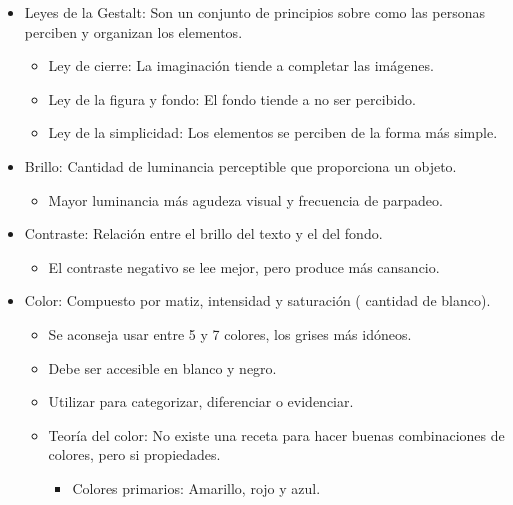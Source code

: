 \documentclass[12pt, twoside, openright]{report} %
\begin{document}
\begin{itemize}
	\item Leyes de la Gestalt: Son un conjunto de principios sobre como
	      las personas perciben y organizan los elementos.

	      \begin{itemize}
		      \item Ley de cierre: La imaginación tiende a completar las imágenes.

		      \item Ley de la figura y fondo: El fondo tiende a no ser percibido.

		      \item Ley de la simplicidad: Los elementos se perciben de la forma
		            más simple.
	      \end{itemize}
	\item Brillo: Cantidad de luminancia perceptible que proporciona un
	      objeto.

	      \begin{itemize}
		      \item Mayor luminancia más agudeza visual y frecuencia de parpadeo.
	      \end{itemize}
	\item Contraste: Relación entre el brillo del texto y el del fondo.

	      \begin{itemize}
		      \item El contraste negativo se lee mejor, pero produce más
		            cansancio.
	      \end{itemize}
	\item Color: Compuesto por matiz, intensidad y saturación ( cantidad
	      de blanco).

	      \begin{itemize}
		      \item Se aconseja usar entre 5 y 7 colores, los grises más idóneos.

		      \item Debe ser accesible en blanco y negro.

		      \item Utilizar para categorizar, diferenciar o evidenciar.

		      \item Teoría del color: No existe una receta para hacer buenas
		            combinaciones de colores, pero si propiedades.

		            \begin{itemize}
			            \item Colores primarios: Amarillo, rojo y azul.


\end{itemize}
\end{itemize}
\end{itemize}
\end{document}
